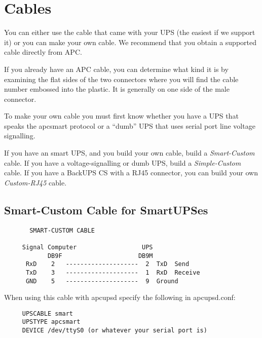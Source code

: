 \label{Cables}
\section*{Cables}

\label{index-Cables-191}
You can either use the cable that came with your UPS (the easiest if we
support it) or you can make your own cable. We recommend that you obtain a
supported cable directly from APC.  

If you already have an APC cable, you can determine what kind it is by
examining the flat sides of the two connectors where you will find the cable
number embossed into the plastic. It is generally on one side of the male
connector.  

To make your own cable you must first know whether you have a UPS that speaks
the apcsmart protocol or a ``dumb'' UPS that uses serial port line voltage
signalling.  

If you have an smart UPS, and you build your own cable, build a {\it
Smart-Custom} cable. If you have a voltage-signalling or dumb UPS, build a
{\it Simple-Custom} cable. If you have a BackUPS CS with a RJ45 connector, you
can build your own {\it Custom-RJ45} cable. 

\subsection*{Smart-Custom Cable for SmartUPSes}

\footnotesize
\begin{verbatim}
       SMART-CUSTOM CABLE
     
     Signal Computer                  UPS
            DB9F                     DB9M
      RxD    2   --------------------  2  TxD  Send
      TxD    3   --------------------  1  RxD  Receive
      GND    5   --------------------  9  Ground
\end{verbatim}
\normalsize

When using this cable with apcupsd specify the following in apcupsd.conf:  

\footnotesize
\begin{verbatim}
     UPSCABLE smart
     UPSTYPE apcsmart
     DEVICE /dev/ttyS0 (or whatever your serial port is)
\end{verbatim}
\normalsize

